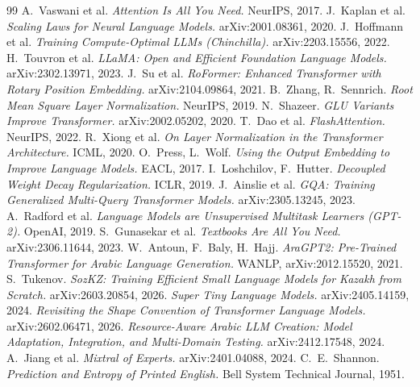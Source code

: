 \documentclass[10pt,twocolumn]{article}
\begin{document}
\begin{thebibliography}{99}
\small
{} A.~Vaswani et al. \emph{Attention Is All You Need.} NeurIPS, 2017.
 J.~Kaplan et al. \emph{Scaling Laws for Neural Language Models.} arXiv:2001.08361, 2020.
 J.~Hoffmann et al. \emph{Training Compute-Optimal LLMs (Chinchilla).} arXiv:2203.15556, 2022.
 H.~Touvron et al. \emph{LLaMA: Open and Efficient Foundation Language Models.} arXiv:2302.13971, 2023.
 J.~Su et al. \emph{RoFormer: Enhanced Transformer with Rotary Position Embedding.} arXiv:2104.09864, 2021.
 B.~Zhang, R.~Sennrich. \emph{Root Mean Square Layer Normalization.} NeurIPS, 2019.
 N.~Shazeer. \emph{GLU Variants Improve Transformer.} arXiv:2002.05202, 2020.
 T.~Dao et al. \emph{FlashAttention.} NeurIPS, 2022.
 R.~Xiong et al. \emph{On Layer Normalization in the Transformer Architecture.} ICML, 2020.
 O.~Press, L.~Wolf. \emph{Using the Output Embedding to Improve Language Models.} EACL, 2017.
 I.~Loshchilov, F.~Hutter. \emph{Decoupled Weight Decay Regularization.} ICLR, 2019.
 J.~Ainslie et al. \emph{GQA: Training Generalized Multi-Query Transformer Models.} arXiv:2305.13245, 2023.
 A.~Radford et al. \emph{Language Models are Unsupervised Multitask Learners (GPT-2).} OpenAI, 2019.
 S.~Gunasekar et al. \emph{Textbooks Are All You Need.} arXiv:2306.11644, 2023.
 W.~Antoun, F.~Baly, H.~Hajj. \emph{AraGPT2: Pre-Trained Transformer for Arabic Language Generation.} WANLP, arXiv:2012.15520, 2021.
 S.~Tukenov. \emph{SozKZ: Training Efficient Small Language Models for Kazakh from Scratch.} arXiv:2603.20854, 2026.
 \emph{Super Tiny Language Models.} arXiv:2405.14159, 2024.
 \emph{Revisiting the Shape Convention of Transformer Language Models.} arXiv:2602.06471, 2026.
 \emph{Resource-Aware Arabic LLM Creation: Model Adaptation, Integration, and Multi-Domain Testing.} arXiv:2412.17548, 2024.
 A.~Jiang et al. \emph{Mixtral of Experts.} arXiv:2401.04088, 2024.
 C.~E.~Shannon. \emph{Prediction and Entropy of Printed English.} Bell System Technical Journal, 1951.
\end{thebibliography}
\end{document}
